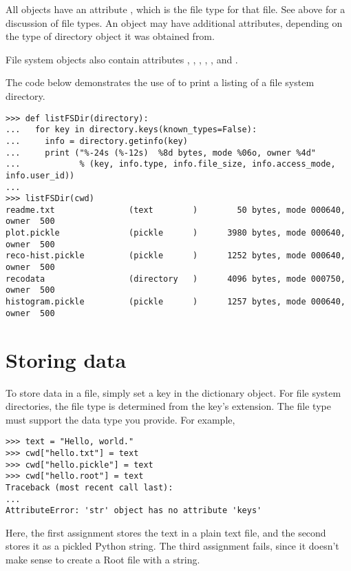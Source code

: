All  objects have an attribute , which is the
file type for that file.  See above for a discussion of file types.  An
 object may have additional attributes, depending on the
type of directory object it was obtained from.

File system  objects also contain attributes ,
, , ,
, and .

The code below demonstrates the use of  to print a
listing of a file system directory.
\begin{verbatim}
>>> def listFSDir(directory):
...   for key in directory.keys(known_types=False):
...     info = directory.getinfo(key)
...     print ("%-24s (%-12s)  %8d bytes, mode %06o, owner %4d"
...            % (key, info.type, info.file_size, info.access_mode, info.user_id))
...
>>> listFSDir(cwd) 
readme.txt               (text        )        50 bytes, mode 000640, owner  500
plot.pickle              (pickle      )      3980 bytes, mode 000640, owner  500
reco-hist.pickle         (pickle      )      1252 bytes, mode 000640, owner  500
recodata                 (directory   )      4096 bytes, mode 000750, owner  500
histogram.pickle         (pickle      )      1257 bytes, mode 000640, owner  500
\end{verbatim}


\section{Storing data}

To store data in a file, simply set a key in the dictionary object.  For
file system directories, the file type is determined from the key's
extension.  The file type must support the data type you provide.  For
example,
\begin{verbatim}
>>> text = "Hello, world."
>>> cwd["hello.txt"] = text
>>> cwd["hello.pickle"] = text
>>> cwd["hello.root"] = text
Traceback (most recent call last):
...
AttributeError: 'str' object has no attribute 'keys'
\end{verbatim}
Here, the first assignment stores the text in a plain text file, and the
second stores it as a pickled Python string.  The third assignment
fails, since it doesn't make sense to create a Root file with a string.

